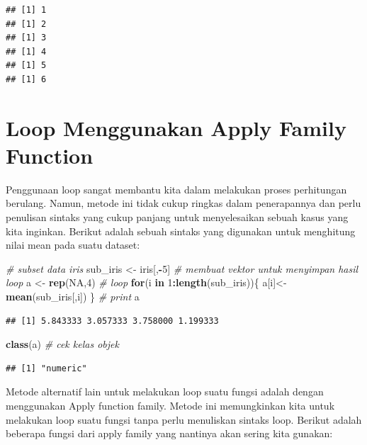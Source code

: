 \documentclass[]{book}
\newenvironment{Shaded}{\begin{snugshade}}{\end{snugshade}}
\newcommand{\CommentTok}[1]{\textcolor[rgb]{0.56,0.35,0.01}{\textit{#1}}}
\newcommand{\ControlFlowTok}[1]{\textcolor[rgb]{0.13,0.29,0.53}{\textbf{#1}}}
\newcommand{\DecValTok}[1]{\textcolor[rgb]{0.00,0.00,0.81}{#1}}
\newcommand{\KeywordTok}[1]{\textcolor[rgb]{0.13,0.29,0.53}{\textbf{#1}}}
\newcommand{\NormalTok}[1]{#1}
\newcommand{\OperatorTok}[1]{\textcolor[rgb]{0.81,0.36,0.00}{\textbf{#1}}}
\newcommand{\OtherTok}[1]{\textcolor[rgb]{0.56,0.35,0.01}{#1}}
\newcommand{\StringTok}[1]{\textcolor[rgb]{0.31,0.60,0.02}{#1}}
\theoremstyle{definition}
\theoremstyle{definition}
\theoremstyle{definition}
\theoremstyle{remark}
\begin{document}
\begin{verbatim}
## [1] 1
## [1] 2
## [1] 3
## [1] 4
## [1] 5
## [1] 6
\end{verbatim}

\hypertarget{loopapply}{%
\section{Loop Menggunakan Apply Family Function}\label{loopapply}}

Penggunaan loop sangat membantu kita dalam melakukan proses perhitungan berulang. Namun, metode ini tidak cukup ringkas dalam penerapannya dan perlu penulisan sintaks yang cukup panjang untuk menyelesaikan sebuah kasus yang kita inginkan. Berikut adalah sebuah sintaks yang digunakan untuk menghitung nilai mean pada suatu dataset:

\begin{Shaded}
\begin{Highlighting}[]
\CommentTok{# subset data iris}
\NormalTok{sub_iris <-}\StringTok{ }\NormalTok{iris[,}\OperatorTok{-}\DecValTok{5}\NormalTok{]}
\CommentTok{# membuat vektor untuk menyimpan hasil loop}
\NormalTok{a <-}\StringTok{ }\KeywordTok{rep}\NormalTok{(}\OtherTok{NA}\NormalTok{,}\DecValTok{4}\NormalTok{)}
\CommentTok{# loop}
\ControlFlowTok{for}\NormalTok{(i }\ControlFlowTok{in} \DecValTok{1}\OperatorTok{:}\KeywordTok{length}\NormalTok{(sub_iris))\{}
\NormalTok{  a[i]<-}\KeywordTok{mean}\NormalTok{(sub_iris[,i])}
\NormalTok{\}}
\CommentTok{# print}
\NormalTok{a}
\end{Highlighting}
\end{Shaded}

\begin{verbatim}
## [1] 5.843333 3.057333 3.758000 1.199333
\end{verbatim}

\begin{Shaded}
\begin{Highlighting}[]
\KeywordTok{class}\NormalTok{(a) }\CommentTok{# cek kelas objek}
\end{Highlighting}
\end{Shaded}

\begin{verbatim}
## [1] "numeric"
\end{verbatim}

Metode alternatif lain untuk melakukan loop suatu fungsi adalah dengan menggunakan Apply function family. Metode ini memungkinkan kita untuk melakukan loop suatu fungsi tanpa perlu menuliskan sintaks loop. Berikut adalah beberapa fungsi dari apply family yang nantinya akan sering kita gunakan:
\end{document}
